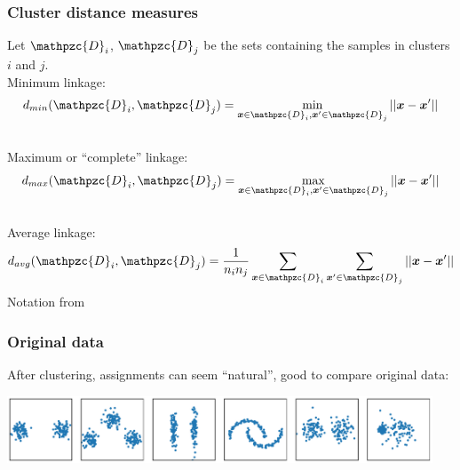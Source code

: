 \documentclass[Nike]{tuberlinbeamer}
\newcommand{\x}{\boldsymbol{x}}
\begin{document}
\begin{frame}
  \frametitle{Cluster distance measures}
  Let $\mathpzc{D}_i$, $\mathpzc{D}_j$ be the sets containing the samples in clusters $i$ and $j$.
  \\
  Minimum linkage:
  \begin{equation*}
    d_{min}(\mathpzc{D}_i, \mathpzc{D}_j) = \min_{\x \in \mathpzc{D}_i, \x' \in \mathpzc{D}_j} ||\x - \x'||
  \end{equation*}
  \pause
  \\
  Maximum or ``complete'' linkage:
  \begin{equation*}
    d_{max}(\mathpzc{D}_i, \mathpzc{D}_j) = \max_{\x \in \mathpzc{D}_i, \x' \in \mathpzc{D}_j} ||\x - \x'||
  \end{equation*}
  \\
  \pause
  Average linkage:
  \begin{equation*}
    d_{avg}(\mathpzc{D}_i, \mathpzc{D}_j) = \frac{1}{n_i n_j} \sum_{\x \in \mathpzc{D}_i} \sum_{\x' \in \mathpzc{D}_j} ||\x - \x'||
  \end{equation*}
  \scriptsize Notation from \cite{duda2012pattern}
\end{frame}

\begin{frame}
  \frametitle{Original data}
  After clustering, assignments can seem ``natural'', good to compare original data:
  \begin{center}
    \centering\includegraphics[width=0.95\textwidth]{sample_clusters.pdf}
  \end{center}
\end{frame}
\end{document}
